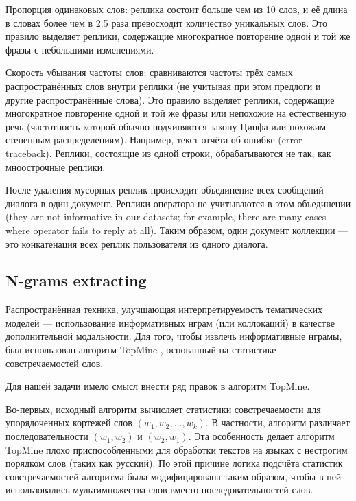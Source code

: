 Пропорция одинаковых слов: реплика состоит больше чем из 10 слов, и её длина в словах более чем в 2.5 раза превосходит количество уникальных слов. Это правило выделяет реплики, содержащие многократное повторение одной и той же фразы с небольшими изменениями.

Скорость убывания частоты слов: сравниваются частоты трёх самых распространённых слов внутри реплики (не учитывая при этом предлоги и другие распространённые слова). Это правило выделяет реплики, содержащие многократное повторение одной и той же фразы или непохожие на естественную речь (частотность которой обычно подчиняются закону Ципфа или похожим степенным распределениям). Например, текст отчёта об ошибке (error traceback). Реплики, состоящие из одной строки, обрабатываются не так, как мноострочные реплики.

После удаления мусорных реплик происходит объединение всех сообщений диалога в один документ. Реплики оператора не учитываются в этом объединении (they are not informative in our datasets; for example, there are many cases where operator fails to reply at all). Таким образом, один документ коллекции --- это конкатенация всех реплик пользователя из одного диалога.


\subsection{N-grams extracting}

\par Распространённая техника, улучшающая интерпретируемость тематических моделей --- использование информативных нграм (или коллокаций) в качестве дополнительной модальности. Для того, чтобы извлечь информативные нграмы, был использован алгоритм TopMine \cite{topmine}, основанный на статистике совстречаемостей слов.


Для нашей задачи имело смысл внести ряд правок в алгоритм TopMine. 

Во-первых, исходный алгоритм вычисляет статистики совстречаемости для упорядоченных кортежей слов $(w_1, w_2, \dots, w_k)$. В частности, алгоритм различает последовательности $(w_1, w_2)$ и $(w_2, w_1)$. Эта особенность делает алгоритм TopMine плохо приспособленными для обработки текстов на языках с нестрогим порядком слов (таких как русский). По этой причине логика подсчёта статистик совстречаемостей алгоритма была модифицирована таким образом, чтобы в ней использовались мультимножества слов вместо последовательностей слов.

